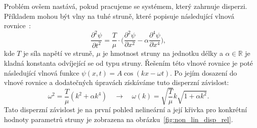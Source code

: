 Problém ovšem nastává, pokud pracujeme se systémem,
který zahrnuje disperzi. Příkladem mohou být vlny
na tuhé struně, které popisuje následující vlnová
rovnice~\cite{yt_dispersion}:
$$
\frac{\partial^2 \psi}{\partial t^2}
   = \frac{T}{\mu} \cdot 
   \bigg(\frac{\partial^2 \psi}{\partial x^2} -
   \alpha \frac{\partial^4 \psi}{\partial x^4}
   \bigg),
$$
kde $T$ je síla napětí ve struně, $\mu$ je
hmotnost struny na jednotku délky a 
$\alpha \in \mathbb{R}$
je kladná konstanta odvíjející se od typu struny.
Řešením této vlnové rovnice je poté následující
vlnová funkce $\psi(x,t) = A\cos(kx - \omega t)$.
Po jejím dosazení do vlnové rovnice a dodatečných
úpravách získáváme tuto disperzní závislost:
$$
\omega^2 = \frac{T}{\mu}(k^2 + \alpha k^4)
\quad\longrightarrow\quad
\omega(k) = \sqrt{\frac{T}{\mu}} k 
\sqrt{1 + \alpha k^2}.
$$
Tato disperzní závislost je na první pohled
nelineární a její křivka pro konkrétní hodnoty
parametrů struny je zobrazena na
obrázku~\ref{fig:non_lin_disp_rel}.
